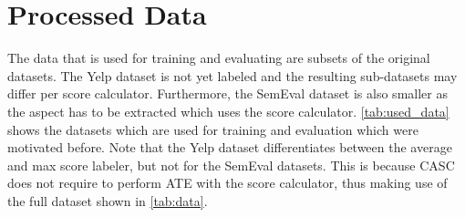 \documentclass[american, oneside]{ecsgdp}
\begin{document}
\section{Processed Data} \label{sec:used_data}
The data that is used for training and evaluating are subsets of the original datasets. The Yelp dataset is not yet labeled and the resulting sub-datasets may differ per score calculator. Furthermore, the SemEval dataset is also smaller as the aspect has to be extracted which uses the score calculator. \cref{tab:used_data} shows the datasets which are used for training and evaluation which were motivated before. Note that the Yelp dataset differentiates between the average and max score labeler, but not for the SemEval datasets. This is because CASC does not require to perform ATE with the score calculator, thus making use of the full dataset shown in \cref{tab:data}.

\begin{table}[htbp]
\centering
\caption{Descriptive statistics of the Yelp, SemEval sub-datasets.}
\label{tab:used_data}
\end{table}
\end{document}
